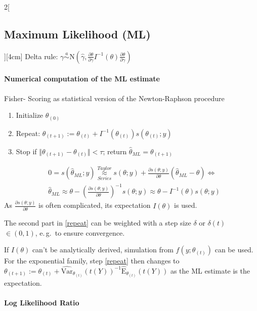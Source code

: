 \documentclass[8pt]{extarticle}
\begin{document}
\begin{multicols}{2}[\subsection{Maximum Likelihood (ML)}][4cm]
\noindent Delta rule: $\gamma \overset{a}{\sim} \mathrm{N}(\hat{\gamma}, \frac{\partial \theta}{\partial\gamma} I^{-1}(\theta) \frac{\partial \theta}{\partial\gamma} )$




\paragraph{Numerical computation of the ML estimate}
Fisher- Scoring as statistical version of the Newton-Raphson procedure

\begin{enumerate}
\item Initialize $\theta_{(0)}$
\item Repeat: $\theta_{(t+1)} := \theta_{(t)} + I^{-1}(\theta_{(t)})s(\theta_{(t)};y)$ \label{repeat}
\item Stop if $\Vert \theta_{(t+1)} -\theta_{(t)} \Vert < \tau$; return $\hat{\theta}_{ML}=\theta_{(t+1)}$
\end{enumerate}

\begin{Proof}
\vspace{-1.5em}
\begin{align*}
&0 = s(\hat{\theta}_{ML};y) \overset{Taylor}{\underset{Series}{\approx}} s(\theta;y) + \frac{\partial s(\theta;y)}{\partial \theta} (\hat{\theta}_{ML} - \theta) \Leftrightarrow \\
&\hat{\theta}_{ML} \approx \theta - \left(\frac{\partial s(\theta;y)}{\partial \theta}\right)^{-1} s(\theta;y) \approx \theta - I^{-1}(\theta)s(\theta;y)
\end{align*}
As $\frac{\partial s(\theta;y)}{\partial \theta}$ is often complicated, its expectation $I(\theta)$ is used.
\end{Proof}

\noindent The second part in \ref{repeat} can be weighted with a step size $\delta$ or $\delta(t)$ $\in (0,1)$, e.\,g.\ to ensure convergence.

\noindent If $I(\theta)$ can't be analytically derived, simulation from $f(y;\theta_{(t)})$ can be used. For the exponential family, step \ref{repeat} then changes to $\theta_{(t+1)} := \theta_{(t)} + \widehat{\mathrm{Var}}_{\theta_{(t)}}(t(Y))^{-1} \widehat{\mathrm{E}}_{\theta_{(t)}}(t(Y))$ as the ML estimate is the expectation.

\paragraph{Log Likelihood Ratio}


\end{multicols}
\end{document}
